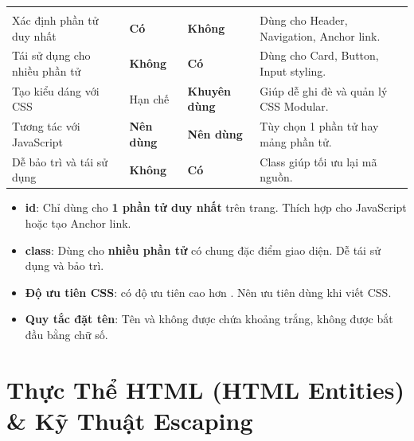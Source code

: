 \begin{prettyTableBox}
\begin{tabularx}{\linewidth}{K{2.8cm} C{1.8cm} C{2.0cm} Z}
 &  &  &  \\
Xác định phần tử duy nhất & \textbf{Có} & \textbf{Không} & Dùng cho Header, Navigation, Anchor link. \\
Tái sử dụng cho nhiều phần tử & \textbf{Không} & \textbf{Có} & Dùng cho Card, Button, Input styling. \\
Tạo kiểu dáng với CSS & Hạn chế & \textbf{Khuyên dùng} & Giúp dễ ghi đè và quản lý CSS Modular. \\
Tương tác với JavaScript & \textbf{Nên dùng} & \textbf{Nên dùng} & Tùy chọn 1 phần tử hay mảng phần tử. \\
Dễ bảo trì và tái sử dụng & \textbf{Không} & \textbf{Có} & Class giúp tối ưu lại mã nguồn. \\
\end{tabularx}
\end{prettyTableBox}

\begin{conceptBox}
\begin{itemize}[leftmargin=1.5em, itemsep=3pt, parsep=0pt]
    \item \textbf{id}: Chỉ dùng cho \textbf{1 phần tử duy nhất} trên trang. Thích hợp cho JavaScript  hoặc tạo Anchor link.
    \item \textbf{class}: Dùng cho \textbf{nhiều phần tử} có chung đặc điểm giao diện. Dễ tái sử dụng và bảo trì.
    \item \textbf{Độ ưu tiên CSS}:  có độ ưu tiên cao hơn . Nên ưu tiên dùng  khi viết CSS.
    \item \textbf{Quy tắc đặt tên}: Tên  và  không được chứa khoảng trắng, không được bắt đầu bằng chữ số.
\end{itemize}
\end{conceptBox}

\Needspace*{80pt}
\section{Thực Thể HTML (HTML Entities) \& Kỹ Thuật Escaping}

